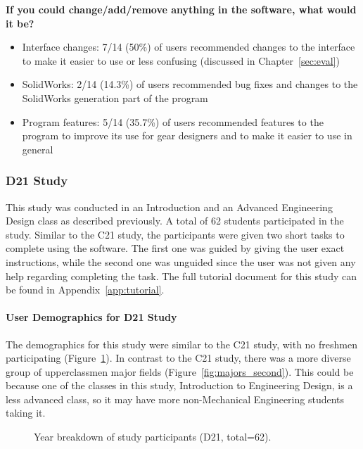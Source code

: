 \begin{doublespace}
\begin{singlespace}
\textbf{If you could change/add/remove anything in the software, what would it be?}
\begin{itemize}
    \item Interface changes: 7/14 (50\%) of users recommended changes to the interface to make it easier to use or less confusing (discussed in Chapter~\ref{sec:eval})
    \item SolidWorks: 2/14 (14.3\%) of users recommended bug fixes and changes to the SolidWorks generation part of the program
    \item Program features: 5/14 (35.7\%) of users recommended features to the program to improve its use for gear designers and to make it easier to use in general
\end{itemize}

\end{singlespace}

\subsubsection{D21 Study}
This study was conducted in an Introduction and an Advanced Engineering Design class as described previously. A total of 62 students participated in the study. Similar to the C21 study, the participants were given two short tasks to complete using the software. The first one was guided by giving the user exact instructions, while the second one was unguided since the user was not given any help regarding completing the task. The full tutorial document for this study can be found in Appendix~\ref{app:tutorial}.

\paragraph{User Demographics for D21 Study}

The demographics for this study were similar to the C21 study, with no freshmen participating (Figure~\ref{fig:grades_second}). In contrast to the C21 study, there was a more diverse group of upperclassmen major fields (Figure~\ref{fig:majors_second}). This could be because one of the classes in this study, Introduction to Engineering Design, is a less advanced class, so it may have more non-Mechanical Engineering students taking it.

\begin{figure}[htbp]
    \centering
    \caption{Year breakdown of study participants (D21, total=62).}
    \label{fig:grades_second}
\end{figure}


\end{doublespace}
